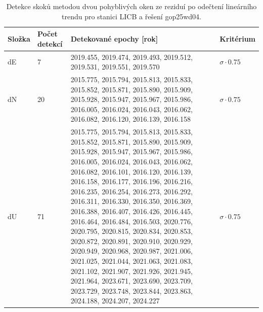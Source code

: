 \begin{table}[htbp]
\caption{Detekce skoků metodou dvou pohyblivých oken ze reziduí po odečtení lineárního trendu pro stanici LICB a řešení gop25wd04.}
\label{tab:gop25wd04_stcd_licb_detr_weighted_1seg_jumps_sliding_window}
\begin{tabular}{llll}
\toprule
Složka & Počet detekcí & Detekované epochy [rok] & Kritérium \\
\midrule
dE & 7 & 2019.455, 2019.474, 2019.493, 2019.512, 2019.531, 2019.551, 2019.570 & $\sigma \cdot 0.75$ \\
dN & 20 & 2015.775, 2015.794, 2015.813, 2015.833, 2015.852, 2015.871, 2015.890, 2015.909, 2015.928, 2015.947, 2015.967, 2015.986, 2016.005, 2016.024, 2016.043, 2016.062, 2016.082, 2016.120, 2016.139, 2016.158 & $\sigma \cdot 0.75$ \\
dU & 71 & 2015.775, 2015.794, 2015.813, 2015.833, 2015.852, 2015.871, 2015.890, 2015.909, 2015.928, 2015.947, 2015.967, 2015.986, 2016.005, 2016.024, 2016.043, 2016.062, 2016.082, 2016.101, 2016.120, 2016.139, 2016.158, 2016.177, 2016.196, 2016.216, 2016.235, 2016.254, 2016.273, 2016.292, 2016.311, 2016.330, 2016.350, 2016.369, 2016.388, 2016.407, 2016.426, 2016.445, 2016.464, 2016.484, 2016.503, 2020.776, 2020.795, 2020.815, 2020.834, 2020.853, 2020.872, 2020.891, 2020.910, 2020.929, 2020.949, 2020.968, 2020.987, 2021.006, 2021.025, 2021.044, 2021.063, 2021.083, 2021.102, 2021.907, 2021.926, 2021.945, 2021.964, 2023.671, 2023.690, 2023.709, 2023.729, 2023.748, 2023.844, 2023.863, 2024.188, 2024.207, 2024.227 & $\sigma \cdot 0.75$ \\
\bottomrule
\end{tabular}
\end{table}
